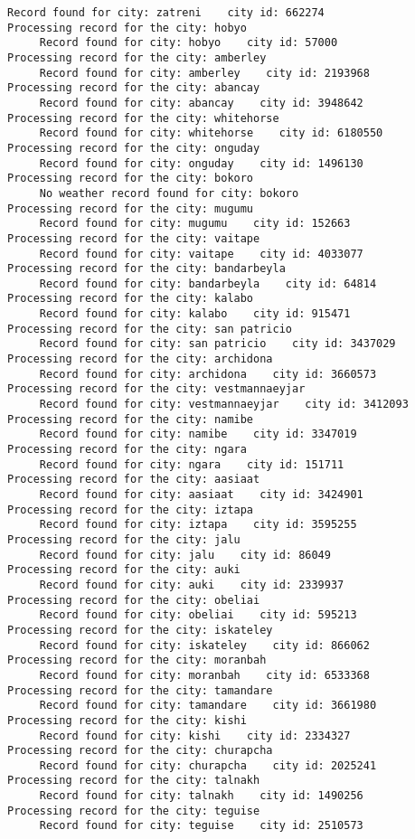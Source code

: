 \documentclass[11pt]{article}
\begin{document}
\begin{Verbatim}[commandchars=\\\{\}]
     Record found for city: zatreni    city id: 662274
Processing record for the city: hobyo
     Record found for city: hobyo    city id: 57000
Processing record for the city: amberley
     Record found for city: amberley    city id: 2193968
Processing record for the city: abancay
     Record found for city: abancay    city id: 3948642
Processing record for the city: whitehorse
     Record found for city: whitehorse    city id: 6180550
Processing record for the city: onguday
     Record found for city: onguday    city id: 1496130
Processing record for the city: bokoro
     No weather record found for city: bokoro
Processing record for the city: mugumu
     Record found for city: mugumu    city id: 152663
Processing record for the city: vaitape
     Record found for city: vaitape    city id: 4033077
Processing record for the city: bandarbeyla
     Record found for city: bandarbeyla    city id: 64814
Processing record for the city: kalabo
     Record found for city: kalabo    city id: 915471
Processing record for the city: san patricio
     Record found for city: san patricio    city id: 3437029
Processing record for the city: archidona
     Record found for city: archidona    city id: 3660573
Processing record for the city: vestmannaeyjar
     Record found for city: vestmannaeyjar    city id: 3412093
Processing record for the city: namibe
     Record found for city: namibe    city id: 3347019
Processing record for the city: ngara
     Record found for city: ngara    city id: 151711
Processing record for the city: aasiaat
     Record found for city: aasiaat    city id: 3424901
Processing record for the city: iztapa
     Record found for city: iztapa    city id: 3595255
Processing record for the city: jalu
     Record found for city: jalu    city id: 86049
Processing record for the city: auki
     Record found for city: auki    city id: 2339937
Processing record for the city: obeliai
     Record found for city: obeliai    city id: 595213
Processing record for the city: iskateley
     Record found for city: iskateley    city id: 866062
Processing record for the city: moranbah
     Record found for city: moranbah    city id: 6533368
Processing record for the city: tamandare
     Record found for city: tamandare    city id: 3661980
Processing record for the city: kishi
     Record found for city: kishi    city id: 2334327
Processing record for the city: churapcha
     Record found for city: churapcha    city id: 2025241
Processing record for the city: talnakh
     Record found for city: talnakh    city id: 1490256
Processing record for the city: teguise
     Record found for city: teguise    city id: 2510573

\end{Verbatim}
\end{document}
